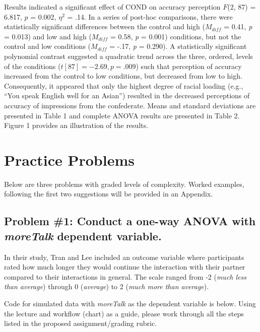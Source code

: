 \documentclass[
  english,
]{book}
\begin{document}
Results indicated a significant effect of COND on accuracy perception \(F\)(2, 87) = 6.817, \(p\) = 0.002, \(\eta^2\) = .14. In a series of post-hoc comparisons, there were statistically significant differences between the control and high (\(M_{diff}\) = 0.41, \emph{p} = 0.013) and low and high (\(M_{diff}\) = 0.58, \emph{p} = 0.001) conditions, but not the control and low conditions (\(M_{diff}\) = -.17, \emph{p} = 0.290). A statistically significant polynomial contrast suggested a quadratic trend across the three, ordered, levels of the conditions (\(t[87] = -2.69, p = .009\)) such that perception of accuracy increased from the control to low conditions, but decreased from low to high. Consequently, it appeared that only the highest degree of racial loading (e.g., ``You speak English well for an Asian'') resulted in the decreased perceptions of accuracy of impressions from the confederate. Means and standard deviations are presented in Table 1 and complete ANOVA results are presented in Table 2. Figure 1 provides an illustration of the results.

\hypertarget{practice-problems}{%
\section{Practice Problems}\label{practice-problems}}

Below are three problems with graded levels of complexity. Worked examples, following the first two suggestions will be provided in an Appendix.

\hypertarget{problem-1-conduct-a-one-way-anova-with-moretalk-dependent-variable.}{%
\subsection{\texorpdfstring{Problem \#1: Conduct a one-way ANOVA with \emph{moreTalk} dependent variable.}{Problem \#1: Conduct a one-way ANOVA with moreTalk dependent variable.}}\label{problem-1-conduct-a-one-way-anova-with-moretalk-dependent-variable.}}

In their study, Tran and Lee \citeyearpar{tran_you_2014} included an outcome variable where participants rated how much longer they would continue the interaction with their partner compared to their interactions in general. The scale ranged from -2 (\emph{much less than average}) through 0 (\emph{average}) to 2 (\emph{much more than average}).

Code for simulated data with \emph{moreTalk} as the dependent variable is below. Using the lecture and workflow (chart) as a guide, please work through all the steps listed in the proposed assignment/grading rubric.
\end{document}
